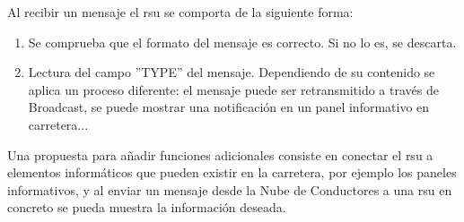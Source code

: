 Al recibir un mensaje el \gls{rsu} se comporta de la siguiente forma:
\begin{enumerate}
	\item Se comprueba que el formato del mensaje es correcto. Si no lo es, se descarta.

	\item Lectura del campo ''TYPE'' del mensaje. Dependiendo de su contenido se aplica
	un proceso diferente: el mensaje puede ser retransmitido a través de Broadcast, se
	puede mostrar una notificación en un panel informativo en carretera...
\end{enumerate}

Una propuesta para añadir funciones adicionales consiste en conectar el \gls{rsu} a
elementos informáticos que pueden existir en la carretera, por ejemplo los paneles
informativos, y al enviar un mensaje desde la Nube de Conductores a una \gls{rsu} en
concreto se pueda muestra la información deseada.
